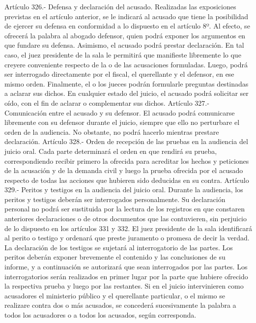     Artículo 326.- Defensa y declaración del acusado. Realizadas las exposiciones previstas en el artículo anterior, se le indicará al acusado que tiene la posibilidad de ejercer su defensa en conformidad a lo dispuesto en el artículo 8º.
    Al efecto, se ofrecerá la palabra al abogado defensor, quien podrá exponer los argumentos en que fundare su defensa.
    Asimismo, el acusado podrá prestar declaración. En tal caso, el juez presidente de la sala le permitirá que manifieste libremente lo que creyere conveniente respecto de la o de las acusaciones formuladas. Luego, podrá ser interrogado directamente por el fiscal, el querellante y el defensor, en ese mismo orden. Finalmente, el o los jueces podrán formularle preguntas destinadas a aclarar sus dichos.
    En cualquier estado del juicio, el acusado podrá solicitar ser oído, con el fin de aclarar o complementar sus dichos.
    Artículo 327.- Comunicación entre el acusado y su defensor. El acusado podrá comunicarse libremente con su defensor durante el juicio, siempre que ello no perturbare el orden de la audiencia. No obstante, no podrá hacerlo mientras prestare declaración.
    Artículo 328.- Orden de recepción de las pruebas en la audiencia del juicio oral. Cada parte determinará el orden en que rendirá su prueba, correspondiendo recibir primero la ofrecida para acreditar los hechos y peticiones de la acusación y de la demanda civil y luego la prueba ofrecida por el acusado respecto de todas las acciones que hubieren sido deducidas en su contra.
    Artículo 329.- Peritos y testigos en la audiencia del juicio oral. Durante la audiencia, los peritos y testigos deberán ser interrogados personalmente. Su declaración personal no podrá ser sustituida por la lectura de los registros en que constaren anteriores declaraciones o de otros documentos que las contuvieren, sin perjuicio de lo dispuesto en los artículos 331 y 332.
    El juez presidente de la sala identificará al perito o testigo y ordenará que preste juramento o promesa de decir la verdad.
    La declaración de los testigos se sujetará al interrogatorio de las partes. Los peritos deberán exponer brevemente el contenido y las conclusiones de su informe, y a continuación se autorizará que sean interrogados por las partes. Los interrogatorios serán realizados en primer lugar por la parte que hubiere ofrecido la respectiva prueba y luego por las restantes. Si en el juicio intervinieren como acusadores el ministerio público y el querellante particular, o el mismo se realizare contra dos o más acusados, se concederá sucesivamente la palabra a todos los acusadores o a todos los acusados, según corresponda.
